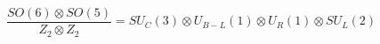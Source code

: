 \begin{equation}
\frac{SO(6) \otimes SO(5)}{Z_2 \otimes Z_2}=SU_C(3)\otimes U_{B-L}(1)\otimes U_R(1) \otimes SU_L(2)
\end{equation}

